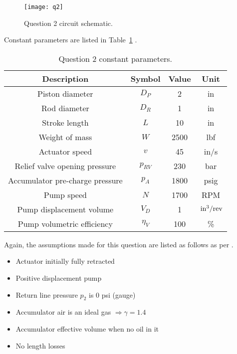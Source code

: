 \begin{figure}[H]
	\centering
	\texttt{[image: q2]}
	\caption{Question 2 circuit schematic.}
	\label{fig:q2}
\end{figure}

Constant parameters are listed in Table~\ref{tab:q2_param} \cite{assign}. 
\begin{table}[H]
	\centering
	\caption{Question 2 constant parameters.}
	\begin{tabular}{cccc}
		\toprule
		\textbf{Description}            & \textbf{Symbol} & \textbf{Value } & \textbf{Unit}     \\
		\midrule
		Piston diameter                 & $D_P$           & 2               & in                \\
		Rod diameter                    & $D_R$           & 1               & in                \\
		Stroke length                   & $L$             & 10              & in                \\
		Weight of mass                  & $W$             & 2500            & lbf               \\
		Actuator speed                  & $v$             & 45              & in/s              \\
		Relief valve opening pressure   & $p_{RV}$        & 230             & bar               \\
		Accumulator pre-charge pressure & $p_A$           & 1800            & psig              \\
		Pump speed                      & $N$             & 1700            & RPM               \\
		Pump displacement volume        & $V_D$           & 1               & $\,\mathrm{in^3/rev}$ \\
		Pump volumetric efficiency      & $\eta_V$        & 100             & \%                \\
		\bottomrule    
	\end{tabular}
	\label{tab:q2_param}%
\end{table}%

Again, the assumptions made for this question are listed as follows as per \cite{assign}.
\begin{itemize}
	\item Actuator initially fully retracted
	\item Positive displacement pump
	\item Return line pressure $p_2$ is 0 psi (gauge)
	\item Accumulator air is an ideal gas $\Rightarrow \gamma=1.4$ 
	\item Accumulator effective volume when no oil in it
	\item No length losses
\end{itemize}

